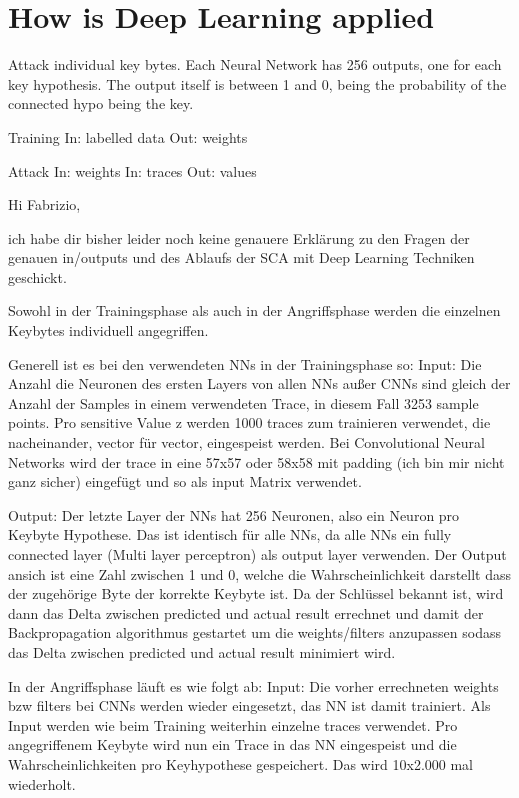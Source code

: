 

\section{How is Deep Learning applied}
Attack individual key bytes.
Each Neural Network has 256 outputs, one for each key hypothesis.
The output itself is between 1 and 0, being the probability of the connected hypo being the key.

Training
In: labelled data
Out: weights

Attack
In: weights
In: traces
Out: values

Hi Fabrizio,

ich habe dir bisher leider noch keine genauere Erklärung zu den Fragen der genauen in/outputs und des Ablaufs der SCA mit Deep Learning Techniken geschickt. 

Sowohl in der Trainingsphase als auch in der Angriffsphase werden die einzelnen Keybytes individuell angegriffen.

Generell ist es bei den verwendeten NNs in der Trainingsphase so:
Input:
Die Anzahl die Neuronen des ersten Layers von allen NNs außer CNNs sind gleich der Anzahl der Samples in einem verwendeten Trace, in diesem Fall 3253 sample points.
Pro sensitive Value z werden 1000 traces zum trainieren verwendet, die nacheinander, vector für vector, eingespeist werden. Bei Convolutional Neural Networks wird der trace in eine 57x57 oder 58x58 mit padding (ich bin mir nicht ganz sicher) eingefügt und so als input Matrix verwendet.

Output: 
Der letzte Layer der NNs hat 256 Neuronen, also ein Neuron pro Keybyte Hypothese. Das ist identisch für alle NNs, da alle NNs ein fully connected layer (Multi layer perceptron) als output layer verwenden. 
Der Output ansich ist eine Zahl zwischen 1 und 0, welche die Wahrscheinlichkeit darstellt dass der zugehörige Byte der korrekte Keybyte ist.
Da der Schlüssel bekannt ist, wird dann das Delta zwischen predicted und actual result errechnet und damit der Backpropagation algorithmus gestartet um die weights/filters anzupassen sodass das Delta zwischen predicted und actual result minimiert wird.


In der Angriffsphase läuft es wie folgt ab:
Input: 
Die vorher errechneten weights bzw filters bei CNNs werden wieder eingesetzt, das NN ist damit trainiert. Als Input werden wie beim Training weiterhin einzelne traces verwendet.
Pro angegriffenem Keybyte wird nun ein Trace in das NN eingespeist und die Wahrscheinlichkeiten pro Keyhypothese gespeichert. Das wird 10x2.000 mal wiederholt. 

